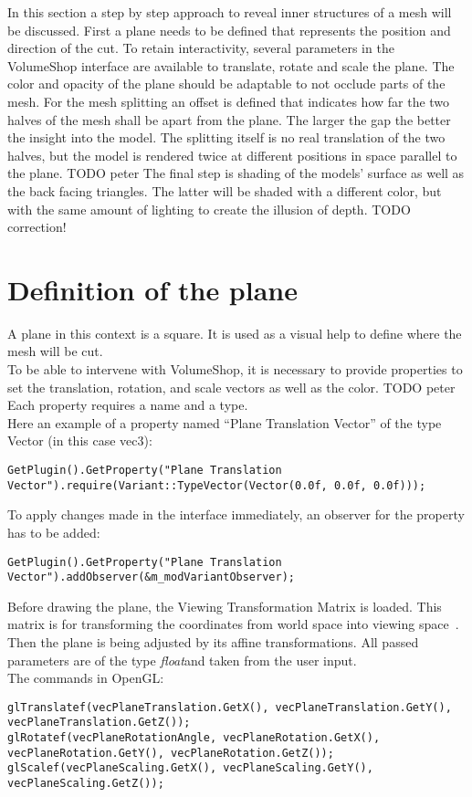 
In this section a step by step approach to reveal inner structures of a mesh will be discussed. First a plane needs to be defined that represents the position and direction of the cut. To retain interactivity, several parameters in the VolumeShop interface are available to translate, rotate and scale the plane. The color and opacity of the plane should be adaptable to not occlude parts of the mesh. For the mesh splitting an offset is defined that indicates how far the two halves of the mesh shall be apart from the plane. The larger the gap the better the insight into the model. The splitting itself is no real translation of the two halves, but the model is rendered twice at different positions in space parallel to the plane. 
TODO peter
The final step is shading of the models' surface as well as the back facing triangles. The latter will be shaded with a different color, but with the same amount of lighting to create the illusion of depth.
TODO correction!

\section{Definition of the plane}
\label{chap:planeDefinition}
A plane in this context is a square. It is used as a visual help to define where the mesh will be cut.\\
To be able to intervene with VolumeShop, it is necessary to provide properties to set the translation, rotation, and scale vectors as well as the color.
TODO peter
Each property requires a name and a type.\\
Here an example of a property named "`Plane Translation Vector"' of the type Vector (in this case vec3):
\begin{lstlisting}
GetPlugin().GetProperty("Plane Translation Vector").require(Variant::TypeVector(Vector(0.0f, 0.0f, 0.0f)));
\end{lstlisting}

To apply changes made in the interface immediately, an observer for the property has to be added:
\begin{lstlisting}
GetPlugin().GetProperty("Plane Translation Vector").addObserver(&m_modVariantObserver);
\end{lstlisting}

Before drawing the plane, the Viewing Transformation Matrix is loaded. This matrix is for transforming the coordinates from world space into viewing space~\cite{book:computerGraphicsHearn}.\\
Then the plane is being adjusted by its affine transformations. All passed parameters are of the type \emph{float}and taken from the user input.\\
The commands in OpenGL:
\begin{lstlisting}
glTranslatef(vecPlaneTranslation.GetX(), vecPlaneTranslation.GetY(), vecPlaneTranslation.GetZ());
glRotatef(vecPlaneRotationAngle, vecPlaneRotation.GetX(), vecPlaneRotation.GetY(), vecPlaneRotation.GetZ());
glScalef(vecPlaneScaling.GetX(), vecPlaneScaling.GetY(), vecPlaneScaling.GetZ());
\end{lstlisting}

